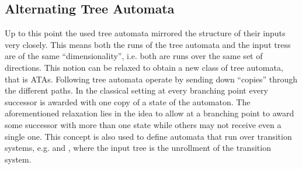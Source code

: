 \subsection{Alternating Tree Automata}
Up to this point the used tree automata mirrored the structure of their inputs
very closely. This means both the runs of the tree automata and the input tress
are of the same \enquote{dimensionality}, i.e. both are runs over the same set
of directions. This notion can be relaxed to obtain a new class of tree
automata, that is \aclp{ATA}. Following \cite{AltTreeAuto} tree automata
operate by sending down \enquote{copies} through the different paths. In the
classical setting at every branching point every successor is awarded with one
copy of a state of the automaton. The aforementioned relaxation lies in the
idea to allow at a branching point to award some successor with more than one
state while others may not receive even a single one. This concept is also used 
to define automata that run over transition systems, e.g.
\cite[Chapter 9]{AutoLogInfGames} and \cite{SynProbEnv}, where the input tree
is the unrollment of the transition system.

